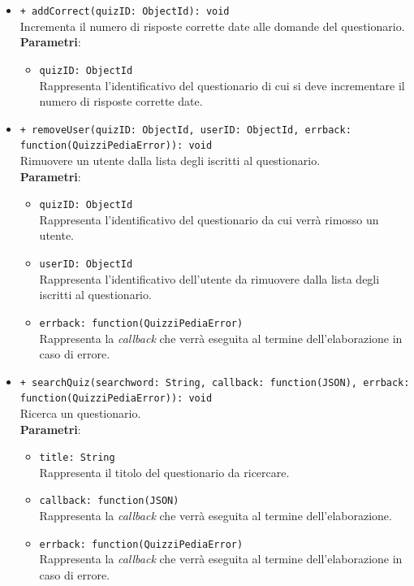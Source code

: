 \begin{itemize}
\begin{itemize}
			\item \texttt{+ addCorrect(quizID: ObjectId): void}\\
			Incrementa il numero di risposte corrette date alle domande del questionario.\\
			\textbf{Parametri}:
			\begin{itemize}
				\item \texttt{quizID: ObjectId}\\
				Rappresenta l'identificativo del questionario di cui si deve incrementare il numero di risposte corrette date.
			\end{itemize}
			
			\item \texttt{+ removeUser(quizID: ObjectId, userID: ObjectId, errback: function(QuizziPediaError)): void}\\
			Rimuovere un utente dalla lista degli iscritti al questionario.\\
			\textbf{Parametri}:
			\begin{itemize}
				\item \texttt{quizID: ObjectId}\\
				Rappresenta l'identificativo del questionario da cui verrà rimosso un utente.
				\item \texttt{userID: ObjectId}\\
				Rappresenta l'identificativo dell'utente da rimuovere dalla lista degli iscritti al questionario.
				\item \texttt{errback: function(QuizziPediaError)}\\
				Rappresenta la \textit{callback} che verrà eseguita al termine dell'elaborazione in caso di errore.
			\end{itemize}
			
			\item \texttt{+ searchQuiz(searchword: String, callback: function(JSON), errback: function(QuizziPediaError)): void}\\
			Ricerca un questionario.\\
			\textbf{Parametri}:
			\begin{itemize}
				\item \texttt{title: String}\\
				Rappresenta il titolo del questionario da ricercare.
				\item \texttt{callback: function(JSON)}\\
				Rappresenta la \textit{callback} che verrà eseguita al termine dell'elaborazione.
				\item \texttt{errback: function(QuizziPediaError)}\\
				Rappresenta la \textit{callback} che verrà eseguita al termine dell'elaborazione in caso di errore.
			\end{itemize}
			

\end{itemize}
\end{itemize}
